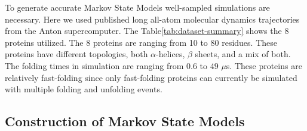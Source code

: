 To generate accurate Markov State Models well-sampled simulations are necessary. Here we used published long all-atom molecular dynamics trajectories from the Anton supercomputer\cite{lindorff2011}.
The Table\ref{tab:dataset-summary} shows the 8 proteins utilized. The 8 proteins are ranging from 10 to 80 residues. These proteins have different topologies, both $\alpha$-helices, $\beta$ sheets, and a mix of both. The folding times in simulation are ranging from $0.6$ to $49$ $\mu$s. These proteins are relatively fast-folding since only fast-folding proteins can currently be simulated with multiple folding and unfolding events.

\begin{table}[!ht]
\centering
\caption{Proteins for reference data}
\label{tab:dataset-summary}
\end{table}

\subsection{\label{sec:methods-msm}Construction of Markov State Models}

